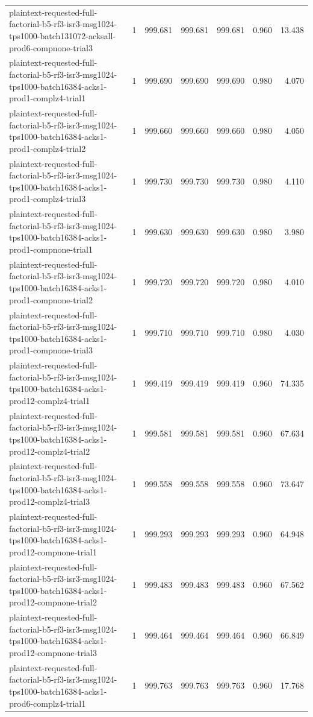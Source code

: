 \begin{tabular}{lrrrrrr}
plaintext-requested-full-factorial-b5-rf3-isr3-msg1024-tps1000-batch131072-acksall-prod6-compnone-trial3 & 1 & 999.681 & 999.681 & 999.681 & 0.960 & 13.438 \\
plaintext-requested-full-factorial-b5-rf3-isr3-msg1024-tps1000-batch16384-acks1-prod1-complz4-trial1 & 1 & 999.690 & 999.690 & 999.690 & 0.980 & 4.070 \\
plaintext-requested-full-factorial-b5-rf3-isr3-msg1024-tps1000-batch16384-acks1-prod1-complz4-trial2 & 1 & 999.660 & 999.660 & 999.660 & 0.980 & 4.050 \\
plaintext-requested-full-factorial-b5-rf3-isr3-msg1024-tps1000-batch16384-acks1-prod1-complz4-trial3 & 1 & 999.730 & 999.730 & 999.730 & 0.980 & 4.110 \\
plaintext-requested-full-factorial-b5-rf3-isr3-msg1024-tps1000-batch16384-acks1-prod1-compnone-trial1 & 1 & 999.630 & 999.630 & 999.630 & 0.980 & 3.980 \\
plaintext-requested-full-factorial-b5-rf3-isr3-msg1024-tps1000-batch16384-acks1-prod1-compnone-trial2 & 1 & 999.720 & 999.720 & 999.720 & 0.980 & 4.010 \\
plaintext-requested-full-factorial-b5-rf3-isr3-msg1024-tps1000-batch16384-acks1-prod1-compnone-trial3 & 1 & 999.710 & 999.710 & 999.710 & 0.980 & 4.030 \\
plaintext-requested-full-factorial-b5-rf3-isr3-msg1024-tps1000-batch16384-acks1-prod12-complz4-trial1 & 1 & 999.419 & 999.419 & 999.419 & 0.960 & 74.335 \\
plaintext-requested-full-factorial-b5-rf3-isr3-msg1024-tps1000-batch16384-acks1-prod12-complz4-trial2 & 1 & 999.581 & 999.581 & 999.581 & 0.960 & 67.634 \\
plaintext-requested-full-factorial-b5-rf3-isr3-msg1024-tps1000-batch16384-acks1-prod12-complz4-trial3 & 1 & 999.558 & 999.558 & 999.558 & 0.960 & 73.647 \\
plaintext-requested-full-factorial-b5-rf3-isr3-msg1024-tps1000-batch16384-acks1-prod12-compnone-trial1 & 1 & 999.293 & 999.293 & 999.293 & 0.960 & 64.948 \\
plaintext-requested-full-factorial-b5-rf3-isr3-msg1024-tps1000-batch16384-acks1-prod12-compnone-trial2 & 1 & 999.483 & 999.483 & 999.483 & 0.960 & 67.562 \\
plaintext-requested-full-factorial-b5-rf3-isr3-msg1024-tps1000-batch16384-acks1-prod12-compnone-trial3 & 1 & 999.464 & 999.464 & 999.464 & 0.960 & 66.849 \\
plaintext-requested-full-factorial-b5-rf3-isr3-msg1024-tps1000-batch16384-acks1-prod6-complz4-trial1 & 1 & 999.763 & 999.763 & 999.763 & 0.960 & 17.768 \\

\end{tabular}
